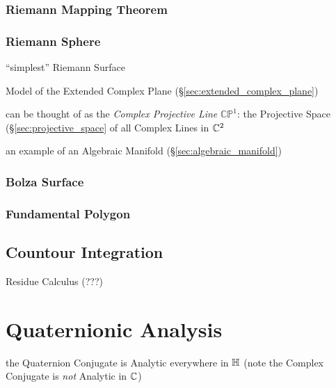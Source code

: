 \subsubsection{Riemann Mapping Theorem}
\label{sec:riemann_mapping_theorem}

\subsubsection{Riemann Sphere}\label{sec:riemann_sphere}

``simplest'' Riemann Surface

Model of the Extended Complex Plane
(\S\ref{sec:extended_complex_plane})

can be thought of as the \emph{Complex Projective Line}
$\mathbb{CP}^1$: the Projective Space (\S\ref{sec:projective_space} of
all Complex Lines in $\mathbb{C}^2$

an example of an Algebraic Manifold (\S\ref{sec:algebraic_manifold})



\subsubsection{Bolza Surface}\label{sec:bolza_surface}

\subsubsection{Fundamental Polygon}\label{sec:fundamental_polygon}



\subsection{Countour Integration}\label{sec:contour_integration}

Residue Calculus (???) %



\section{Quaternionic Analysis}\label{sec:quaternionic_analysis}

the Quaternion Conjugate is Analytic everywhere in $\mathbb{H}$
(note the Complex Conjugate is \emph{not} Analytic in $\mathbb{C}$)

